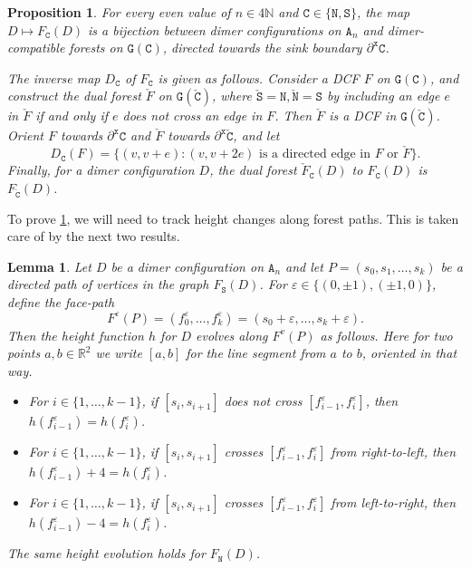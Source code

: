 \documentclass[11pt,twoside]{amsart}
\theoremstyle{plain}
\newtheorem{prop}[thm]{Proposition}
\newtheorem{lem}[thm]{Lemma}
\numberwithin{quest}{section}
\theoremstyle{remark}
\numberwithin{rem}{section}
\theoremstyle{definition}
\newcommand{\eps}{\varepsilon}
\newcommand{\N}{\mathbb{N}}
\newcommand{\R}{\mathbb{R}}
\renewcommand{\tt}[1]{{\mathtt{#1}}}
\begin{document}
	\begin{prop}
		\label{P:temperley-bij}
		For every even value of $n \in 4 \N$ and $\tt{C} \in \{\tt{N}, \tt{S}\} $, the map $D \mapsto F_{\tt{C}}(D)$ is a bijection between dimer configurations on $\tt{A}_n$ and dimer-compatible forests on $\tt{G}(\mathtt{C})$, directed towards the sink boundary $\partial^\tt{x} \mathtt{C}$. 
		
		The inverse map $D_\tt{C}$ of $F_{\tt{C}}$ is given as follows. Consider a DCF $F$ on $\tt{G}(\mathtt{C})$, and construct the dual forest $\check F$ on $\tt{G}(\mathtt{\check C})$, where $\tt{\check S} = \tt{N}, \tt{\check N} = \tt{S}$ by including an edge $e$ in $\check F$ if and only if $e$ does not cross an edge in $F$. Then $\check F$ is a DCF in $\tt{G}(\mathtt{\check C})$. Orient $F$ towards $\partial^\tt{x} \tt{C}$ and $\check F$ towards $\partial^\tt{x} \tt{\check C}$, and let
		$$
		D_\tt{C}(F) = \{(v, v + e) : (v, v + 2e) \text{ is a directed edge in } F \text{ or } \check F \}.
		$$
		Finally, for a dimer configuration $D$, the dual forest $\check F_{\tt{C}}(D)$ to $F_{\tt{C}}(D)$ is $F_{\tt{\check C}}(D)$.
	\end{prop}
	To prove \cref{P:temperley-bij}, we will need to track height changes along forest paths. This is taken care of by the next two results.
	
	\begin{lem}
		\label{L:tree-path-heights}
		Let $D$ be a dimer configuration on $\tt{A}_n$ and let $P = (s_0, s_1, \dots, s_k)$ be a directed path of vertices in the graph $F_{\tt{S}}(D)$. For $\eps \in \{(0, \pm 1), (\pm 1, 0)\}$, define the face-path 
		$$
		F^\eps(P) = (f_0^\eps, \dots, f_k^\eps) = (s_0 + \eps, \dots, s_k + \eps).
		$$
		Then the height function $h$ for $D$ evolves along $F^v(P)$ as follows. Here for two points $a, b \in \R^2$ we write $[a, b]$ for the line segment from $a$ to $b$, oriented in that way.
		\begin{itemize}
			\item For $i \in \{1, \dots, k-1\}$, if $[s_i, s_{i+1}]$ does not cross $[f_{i-1}^\eps, f^\eps_i]$, then $h(f_{i-1}^\eps) = h(f_i^\eps)$.
			\item For $i \in \{1, \dots, k-1\}$, if $[s_i, s_{i+1}]$ crosses $[f_{i-1}^\eps, f^\eps_i]$ from right-to-left, then $h(f_{i-1}^\eps) + 4 = h(f_i^\eps)$.
			\item For $i \in \{1, \dots, k-1\}$, if $[s_i, s_{i+1}]$ crosses $[f_{i-1}^\eps, f^\eps_i]$ from left-to-right, then $h(f_{i-1}^\eps) - 4 = h(f_i^\eps)$.
		\end{itemize}
		The same height evolution holds for $F_{\tt{N}}(D)$.
	\end{lem} 
	
\end{document}
